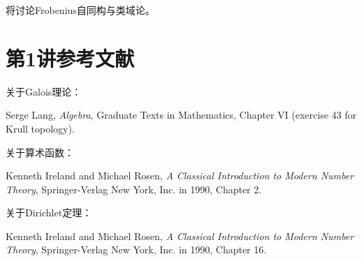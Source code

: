 将讨论Frobenius自同构与类域论。
\section{第1讲参考文献}\label{L1S3}
关于Galois理论：
\begin{references} Serge Lang, \textit{Algebra}, Graduate Texts in Mathematics, Chapter VI (exercise 43 for Krull topology).\end{references}
关于算术函数：
\begin{references} Kenneth Ireland and Michael Rosen, \textit{A Classical Introduction to Modern Number Theory}, Springer-Verlag New York, Inc. in 1990, Chapter 2.\end{references}
关于Dirichlet定理：
\begin{references} Kenneth Ireland and Michael Rosen, \textit{A Classical Introduction to Modern Number Theory}, Springer-Verlag New York, Inc. in 1990, Chapter 16.\end{references}
